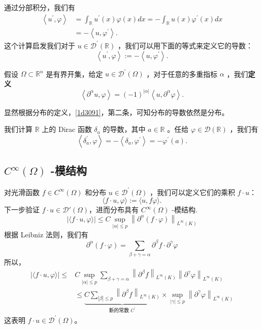 通过分部积分，我们有
\[
\begin{aligned}
\left\langle u^{\prime}, \varphi\right\rangle & =\int_{\mathbb{R}} u^{\prime}(x) \varphi(x) d x=-\int_{\mathbb{R}} u(x) \varphi^{\prime}(x) d x \\
& =-\left\langle u, \varphi^{\prime}\right\rangle .
\end{aligned}
\]
这个计算启发我们对于 $u \in \mathcal{D}^{\prime}(\mathbb{R})$ ，我们可以用下面的等式来定义它的导数：
\[
\left\langle u^{\prime}, \varphi\right\rangle:=-\left\langle u, \varphi^{\prime}\right\rangle .
\]
\begin{definition}
假设 $\Omega \subset \mathbb{R}^n$ 是有界开集，给定 $u \in \mathcal{D}^{\prime}(\Omega)$ ，对于任意的多重指标 $\alpha$ ，我们\textbf{定义}
\[
\left\langle\partial^\alpha u, \varphi\right\rangle=(-1)^{|\alpha|}\left\langle u, \partial^\alpha \varphi\right\rangle .
\]
\end{definition}
显然根据分布的定义，\cref{1d3091}，第二条，可知分布的导数依然是分布。

\begin{example}
我们计算 $\mathbb{R}$ 上的 Dirac 函数 $\delta_a$ 的导数，其中 $a \in \mathbb{R}$ 。任给 $\varphi \in \mathcal{D}(\mathbb{R})$ ，我们有
\[
\left\langle\delta_a^{\prime}, \varphi\right\rangle=-\left\langle\delta_a, \varphi^{\prime}\right\rangle=-\varphi^{\prime}(a) .
\]
\end{example}
\subsection{\texorpdfstring{$C^{\infty}(\Omega)$}{C^infty(Omega)} -模结构}

对光滑函数 $f \in C^{\infty}(\Omega)$ 和分布 $u \in \mathcal{D}^{\prime}(\Omega)$ ，我们可以定义它们的乘积 $f \cdot u$：
\[
\langle f \cdot u, \varphi\rangle:=\langle u, f \varphi\rangle .
\]
下一步验证 $f\cdot u\in \mathcal{D}'(\Omega)$，进而分布具有 $C^{\infty}(\Omega)$ -模结构.
\[
|\langle f \cdot u, \varphi\rangle| \leqslant C \sup _{|\alpha| \leqslant p}\left\|\partial^\alpha(f \cdot \varphi)\right\|_{L^{\infty}(K)}
\]
根据 Leibniz 法则，我们有
\[
\partial^\alpha(f \cdot \varphi)=\sum_{\beta+\gamma=\alpha} \partial^\beta f \cdot \partial^\gamma \varphi
\]
所以，
\[
\begin{aligned}
|\langle f \cdot u, \varphi\rangle| \leqslant & C \sup _{|\alpha| \leqslant p} \sum_{\beta+\gamma=\alpha}\left\|\partial^\beta f\right\|_{L^{\infty}(K)}\left\|\partial^\gamma \varphi\right\|_{L^{\infty}(K)} \\
& \leqslant \underbrace{C \sum_{|\beta| \leqslant p}\left\|\partial^\beta f\right\|_{L^{\infty}(K)}}_{\text {新的常数 } C^{\prime}} \times \sup _{|\gamma| \leqslant p}\left\|\partial^\gamma \varphi\right\|_{L^{\infty}(K)}
\end{aligned}
\]
这表明 $f \cdot u \in \mathcal{D}^{\prime}(\Omega)$。

